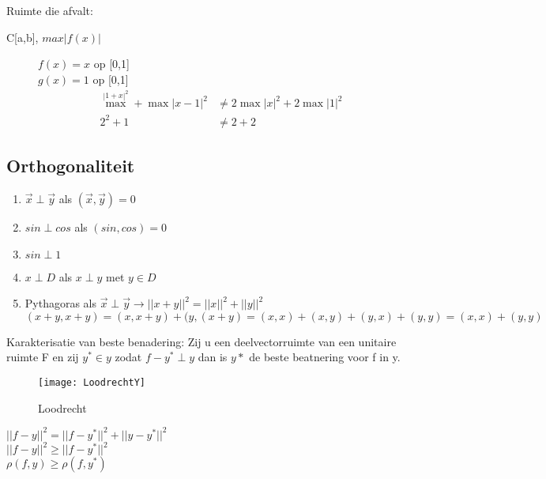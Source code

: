 Ruimte die afvalt: 
\begin{description}
\item [C{[a,b]}, $max|f(x)|$] 


$f(x)=x$ op [0,1] \\
$g(x)=1$ op [0,1] \\
\begin{align*}
\operatorname{max}^|1+x|^2+\operatorname{max}|x-1|^2 &\neq 2\operatorname{max}|x|^2+2\operatorname{max}|1|^2 \\
2^2+1 &\neq 2+2
\end{align*}

\end{description}

\subsection{Orthogonaliteit}
\begin{enumerate}
\item $ \vec{x} \perp \vec{y}$ als $(\vec{x},\vec{y})=0$
\item $sin \perp cos$ als $(sin,cos)=0$ 
\item $sin \perp 1$
\item $x \perp D$ als $x\perp y$ met $y\in D$
\item Pythagoras als $\vec{x}\perp\vec{y} \rightarrow ||x+y||^2=||x||^2+||y||^2
$ \\
$ (x+y,x+y)=(x,x+y)+(y,(x+y)=(x,x)+(x,y)+(y,x)+(y,y)=(x,x)+(y,y) $
\end{enumerate}
Karakterisatie van beste benadering: Zij u een deelvectorruimte van een unitaire ruimte F en zij $y^* \in y$ zodat $f-y^* \perp y$ dan is $y*$ de beste beatnering voor f in y.
\begin{figure}[h]
	\centering
	\texttt{[image: LoodrechtY]}
	\caption{Loodrecht}
\end{figure}
$ ||f-y||^2=||f-y^*||^2+||y-y^*||^2 $ \\
$ ||f-y||^2 \geq ||f-y^*||^2 $ \\
$ \rho(f,y) \geq \rho(f,y^*) $ \\



